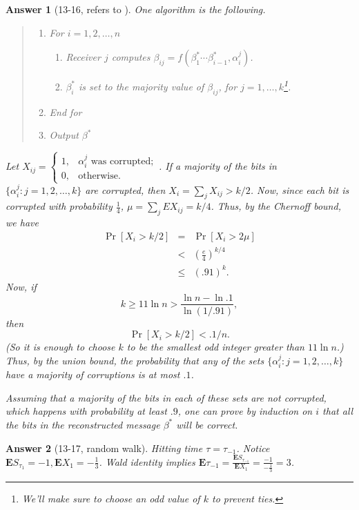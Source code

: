 \documentclass[11pt]{article}
\theoremstyle{numberplain}
\theoremstyle{nonumberplain}
\newtheorem{ans}{Answer}
\newcommand{\0}{{\mathbf{0}}}
\newcommand{\E}{{\mathbf{E}}}
\begin{document}
\begin{ans}[13-16, refers to \cite{solcornell}] One algorithm is the following.
\begin{quote}
\begin{enumerate}
\item For $i = 1, 2, \ldots, n$
\begin{enumerate}
\item	Receiver $j$ computes $\beta_{ij} = f(\beta_1^* \cdots \beta_{i-1}^*, \alpha_i^j)$.
\item	$\beta_i^*$ is set to the majority value of $\beta_{ij}$, for $j = 1, \ldots, k$\footnote{We'll make sure to choose an odd value of $k$ to prevent ties.}.
\end{enumerate}
\item   End for
\item Output $\beta^*$
\end{enumerate}
\end{quote}


Let $X_{ij} = \left\{ \begin{array}{rl}
1, & \alpha_i^j \text{ was corrupted};\\
0, & \text{otherwise.}\end{array} \right.$.
If a majority of the bits in $\{\alpha_i^j : j = 1, 2, \ldots, k\}$
are corrupted,
then $X_i = \sum_j X_{ij} > k/2$.
Now, since each bit is corrupted with probability $\frac14$,
$\mu = \sum_j EX_{ij} = k/4$.
Thus, by the Chernoff bound, we have
\begin{eqnarray*}
\Pr[X_i > k/2] & = & \Pr[X_i > 2 \mu] \\
& < & \left(\frac{e}{4}\right)^{k/4} \\
& \leq & (.91)^k.
\end{eqnarray*}
Now, if
$$k \geq 11 \ln n > \frac{\ln n - \ln .1}{\ln (1/.91)},$$
then
$$\Pr[X_i > k/2] < .1 / n.$$
(So it is enough to choose $k$ to be the
smallest odd integer greater than $11 \ln n$.)
Thus, by the union bound, the probability that
{\em any} of the sets $\{\alpha_i^j : j = 1, 2, \ldots, k\}$
have a majority of corruptions is at most $.1$.

Assuming that a majority of the bits in each of these sets
are not corrupted, which happens with probability at least $.9$,
one can prove by induction on $i$ that all the bits in
the reconstructed message $\beta^*$ will be correct.
\end{ans}
\begin{ans}[13-17, random walk] Hitting time $\tau=\tau_{-1}$. Notice $\E S_{\tau_1}=-1,\E X_1=-\frac13$. Wald identity implies 
$\E\tau_{-1}=\frac{\E S_{\tau_{-1}}}{\E X_1}=\frac{-1}{-\frac13}=3$.
\end{ans}
\end{document}
